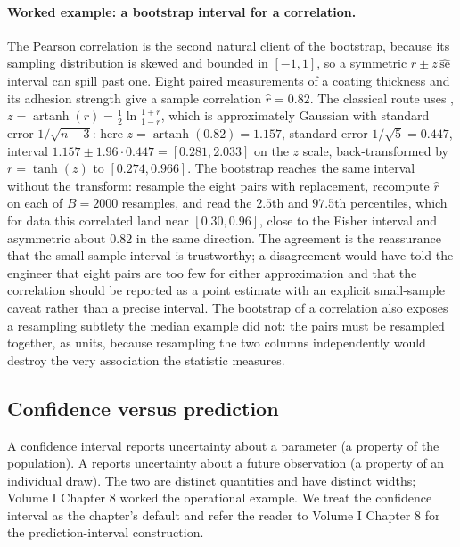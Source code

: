 \paragraph{Worked example: a bootstrap interval for a correlation.}
The Pearson correlation is the second natural client of the bootstrap,
because its sampling distribution is skewed and bounded in $[-1, 1]$,
so a symmetric $\hat{r} \pm z\,\widehat{\mathrm{se}}$ interval can spill
past one. Eight paired measurements of a coating thickness and its
adhesion strength give a sample correlation $\hat{r} = 0.82$. The
classical route uses , $z =
\operatorname{artanh}(r) = \frac{1}{2}\ln\frac{1+r}{1-r}$, which is
approximately Gaussian with standard error $1/\sqrt{n-3}$: here $z =
\operatorname{artanh}(0.82) = 1.157$, standard error $1/\sqrt{5} =
0.447$, interval $1.157 \pm 1.96 \cdot 0.447 = [0.281, 2.033]$ on the
$z$ scale, back-transformed by $r = \tanh(z)$ to $[0.274, 0.966]$.
The bootstrap reaches the same interval without the transform: resample
the eight pairs with replacement, recompute $\hat{r}$ on each of $B =
2000$ resamples, and read the $2.5$th and $97.5$th percentiles, which
for data this correlated land near $[0.30, 0.96]$, close to the
Fisher interval and asymmetric about $0.82$ in the same direction. The
agreement is the reassurance that the small-sample interval is
trustworthy; a disagreement would have told the engineer that eight
pairs are too few for either approximation and that the correlation
should be reported as a point estimate with an explicit small-sample
caveat rather than a precise interval. The bootstrap of a correlation
also exposes a resampling subtlety the median example did not: the
pairs must be resampled together, as units, because resampling the two
columns independently would destroy the very association the statistic
measures.

\subsection{Confidence versus prediction}

A confidence interval reports uncertainty about a parameter (a
property of the population). A  reports
uncertainty about a future observation (a property of an individual
draw). The two are distinct quantities and have distinct widths;
Volume I Chapter 8 worked the operational example. We treat the
confidence interval as the chapter's default and refer the reader
to Volume I Chapter 8 for the prediction-interval construction.

